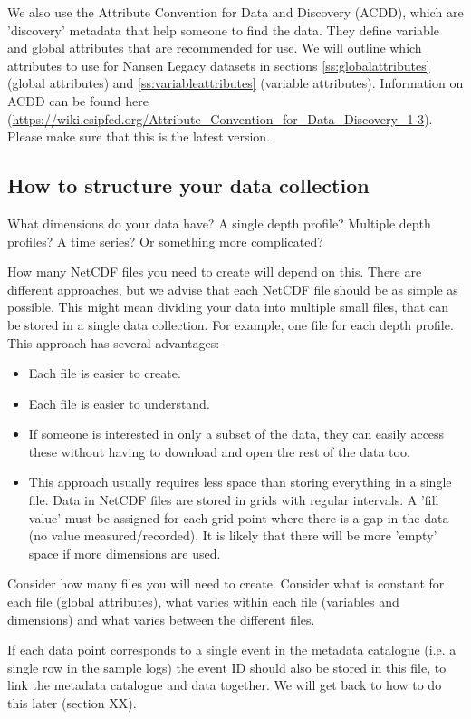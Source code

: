\documentclass[a4paper,english, 11pt]{article}
\begin{document}
We also use the Attribute Convention for Data and Discovery (ACDD), which are 'discovery' metadata that help someone to find the data. They define variable and global attributes that are recommended for use. We will outline which attributes to use for Nansen Legacy datasets in sections \ref{ss:globalattributes} (global attributes) and \ref{ss:variableattributes} (variable attributes). Information on ACDD can be found here (\url{https://wiki.esipfed.org/Attribute_Convention_for_Data_Discovery_1-3}). Please make sure that this is the latest version.

\subsection{How to structure your data collection}
\label{ss:structurecollection}

What dimensions do your data have? A single depth profile? Multiple depth profiles? A time series? Or something more complicated?

How many NetCDF files you need to create will depend on this. There are different approaches, but we advise that each NetCDF file should be as simple as possible. This might mean dividing your data into multiple small files, that can be stored in a single data collection. For example, one file for each depth profile. This approach has several advantages:

\begin{itemize}
\item Each file is easier to create.
\item Each file is easier to understand.
\item If someone is interested in only a subset of the data, they can easily access these without having to download and open the rest of the data too.
\item This approach usually requires less space than storing everything in a single file. Data in NetCDF files are stored in grids with regular intervals. A 'fill value' must be assigned for each grid point where there is a gap in the data (no value measured/recorded). It is likely that there will be more 'empty' space if more dimensions are used. 
\end{itemize}   

Consider how many files you will need to create. Consider what is constant for each file (global attributes), what varies within each file (variables and dimensions) and what varies between the different files.

If each data point corresponds to a single event in the metadata catalogue (i.e. a single row in the sample logs) the event ID should also be stored in this file, to link the metadata catalogue and data together. We will get back to how to do this later (section XX).
\end{document}
